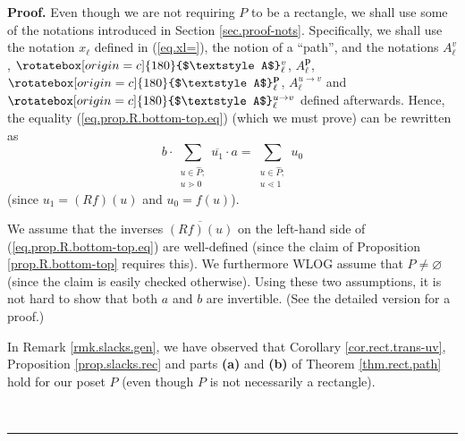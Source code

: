 \documentclass[numbers=enddot,12pt,final,onecolumn,notitlepage]{scrartcl}%
\theoremstyle{definition}
\newenvironment{vershort}{}{}
\newcommand{\upslack}{\mathchoice{\rotatebox[origin=c]{180}{$\displaystyle A$}}{\rotatebox[origin=c]{180}{$\textstyle A$}}{\rotatebox[origin=c]{180}{$\scriptstyle A$}}{\rotatebox[origin=c]{180}{$\scriptscriptstyle A$}}}
\newcommand{\downslack}{A}
\newenvironment{proof}[1][Proof]{\noindent\textbf{#1.} }{\ \rule{0.5em}{0.5em}}
\let\sumnonlimits\sum
\renewcommand{\sum}{\sumnonlimits\limits}
\begin{document}
\begin{vershort}
\begin{proof}
Even though we are not requiring $P$ to be a rectangle, we shall use some of
the notations introduced in Section \ref{sec.proof-nots}. Specifically, we
shall use the notation $x_{\ell}$ defined in (\ref{eq.xl=}), the notion of a
\textquotedblleft path\textquotedblright, and the notations $\downslack_{\ell
}^{v}$, $\upslack_{\ell}^{v}$, $\downslack_{\ell}^{\mathbf{p}}$,
$\upslack_{\ell}^{\mathbf{p}}$, $\downslack_{\ell}^{u\rightarrow v}$ and
$\upslack_{\ell}^{u\rightarrow v}$ defined afterwards. Hence, the equality
(\ref{eq.prop.R.bottom-top.eq}) (which we must prove) can be rewritten as
\begin{equation}
b\cdot\sum_{\substack{u\in\widehat{P};\\u\gtrdot0}}\overline{u_{1}}\cdot
a=\sum_{\substack{u\in\widehat{P};\\u\lessdot1}}u_{0}
\label{pf.prop.R.bottom-top.short.goal}%
\end{equation}
(since $u_{1}=\left(  Rf\right)  \left(  u\right)  $ and $u_{0}=f\left(
u\right)  $).

We assume that the inverses $\overline{\left(  Rf\right)  \left(  u\right)  }$
on the left-hand side of (\ref{eq.prop.R.bottom-top.eq}) are well-defined
(since the claim of Proposition \ref{prop.R.bottom-top} requires this). We
furthermore WLOG assume that $P\neq\varnothing$ (since the claim is easily
checked otherwise). Using these two assumptions, it is not hard to show that
both $a$ and $b$ are invertible. (See the detailed version for a proof.)

In Remark \ref{rmk.slacks.gen}, we have observed that Corollary
\ref{cor.rect.trans-uv}, Proposition \ref{prop.slacks.rec} and parts
\textbf{(a)} and \textbf{(b)} of Theorem \ref{thm.rect.path} hold for our
poset $P$ (even though $P$ is not necessarily a rectangle).


\end{proof}
\end{vershort}
\end{document}
